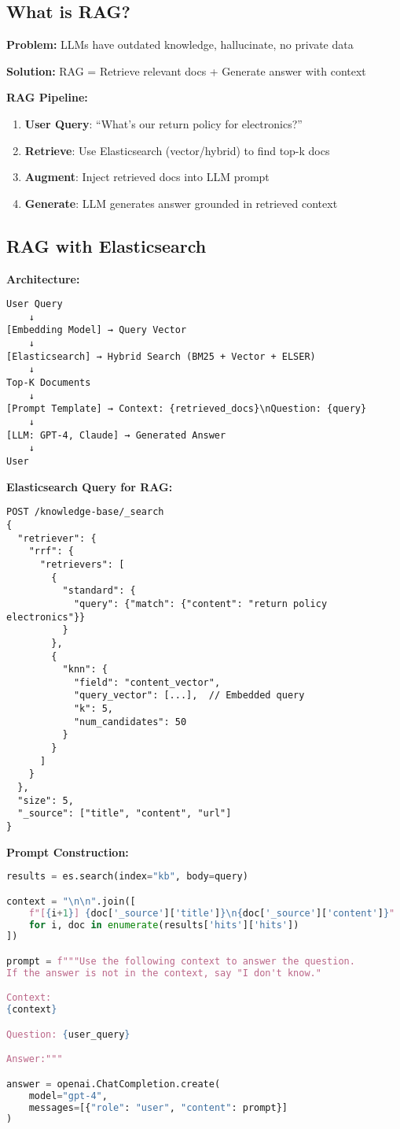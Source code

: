 \documentclass[10pt]{article}
\begin{document}
\subsection{What is RAG?}

\textbf{Problem:} LLMs have outdated knowledge, hallucinate, no private data

\textbf{Solution:} RAG = Retrieve relevant docs + Generate answer with context

\textbf{RAG Pipeline:}
\begin{enumerate}
\item \textbf{User Query}: ``What's our return policy for electronics?''
\item \textbf{Retrieve}: Use Elasticsearch (vector/hybrid) to find top-k docs
\item \textbf{Augment}: Inject retrieved docs into LLM prompt
\item \textbf{Generate}: LLM generates answer grounded in retrieved context
\end{enumerate}

\subsection{RAG with Elasticsearch}

\textbf{Architecture:}
\begin{verbatim}
User Query
    ↓
[Embedding Model] → Query Vector
    ↓
[Elasticsearch] → Hybrid Search (BM25 + Vector + ELSER)
    ↓
Top-K Documents
    ↓
[Prompt Template] → Context: {retrieved_docs}\nQuestion: {query}
    ↓
[LLM: GPT-4, Claude] → Generated Answer
    ↓
User
\end{verbatim}

\textbf{Elasticsearch Query for RAG:}
\begin{lstlisting}
POST /knowledge-base/_search
{
  "retriever": {
    "rrf": {
      "retrievers": [
        {
          "standard": {
            "query": {"match": {"content": "return policy electronics"}}
          }
        },
        {
          "knn": {
            "field": "content_vector",
            "query_vector": [...],  // Embedded query
            "k": 5,
            "num_candidates": 50
          }
        }
      ]
    }
  },
  "size": 5,
  "_source": ["title", "content", "url"]
}
\end{lstlisting}

\textbf{Prompt Construction:}
\begin{lstlisting}[language=Python]
results = es.search(index="kb", body=query)

context = "\n\n".join([
    f"[{i+1}] {doc['_source']['title']}\n{doc['_source']['content']}"
    for i, doc in enumerate(results['hits']['hits'])
])

prompt = f"""Use the following context to answer the question.
If the answer is not in the context, say "I don't know."

Context:
{context}

Question: {user_query}

Answer:"""

answer = openai.ChatCompletion.create(
    model="gpt-4",
    messages=[{"role": "user", "content": prompt}]
)
\end{lstlisting}
\end{document}
